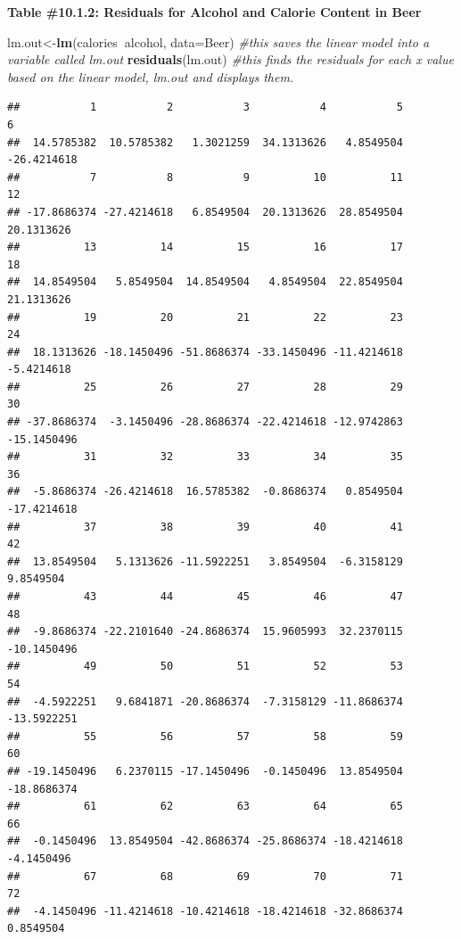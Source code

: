 \documentclass[
]{book}
\newenvironment{Shaded}{\begin{snugshade}}{\end{snugshade}}
\newcommand{\CommentTok}[1]{\textcolor[rgb]{0.56,0.35,0.01}{\textit{#1}}}
\newcommand{\DataTypeTok}[1]{\textcolor[rgb]{0.13,0.29,0.53}{#1}}
\newcommand{\KeywordTok}[1]{\textcolor[rgb]{0.13,0.29,0.53}{\textbf{#1}}}
\newcommand{\NormalTok}[1]{#1}
\newcommand{\OperatorTok}[1]{\textcolor[rgb]{0.81,0.36,0.00}{\textbf{#1}}}
\begin{document}
\textbf{Table \#10.1.2: Residuals for Alcohol and Calorie Content in Beer}

\begin{Shaded}
\begin{Highlighting}[]
\NormalTok{lm.out<-}\KeywordTok{lm}\NormalTok{(calories}\OperatorTok{~}\NormalTok{alcohol, }\DataTypeTok{data=}\NormalTok{Beer) }\CommentTok{#this saves the linear model into a variable called lm.out}
\KeywordTok{residuals}\NormalTok{(lm.out) }\CommentTok{#this finds the residuals for each x value based on the linear model, lm.out and displays them.}
\end{Highlighting}
\end{Shaded}

\begin{verbatim}
##           1           2           3           4           5           6 
##  14.5785382  10.5785382   1.3021259  34.1313626   4.8549504 -26.4214618 
##           7           8           9          10          11          12 
## -17.8686374 -27.4214618   6.8549504  20.1313626  28.8549504  20.1313626 
##          13          14          15          16          17          18 
##  14.8549504   5.8549504  14.8549504   4.8549504  22.8549504  21.1313626 
##          19          20          21          22          23          24 
##  18.1313626 -18.1450496 -51.8686374 -33.1450496 -11.4214618  -5.4214618 
##          25          26          27          28          29          30 
## -37.8686374  -3.1450496 -28.8686374 -22.4214618 -12.9742863 -15.1450496 
##          31          32          33          34          35          36 
##  -5.8686374 -26.4214618  16.5785382  -0.8686374   0.8549504 -17.4214618 
##          37          38          39          40          41          42 
##  13.8549504   5.1313626 -11.5922251   3.8549504  -6.3158129   9.8549504 
##          43          44          45          46          47          48 
##  -9.8686374 -22.2101640 -24.8686374  15.9605993  32.2370115 -10.1450496 
##          49          50          51          52          53          54 
##  -4.5922251   9.6841871 -20.8686374  -7.3158129 -11.8686374 -13.5922251 
##          55          56          57          58          59          60 
## -19.1450496   6.2370115 -17.1450496  -0.1450496  13.8549504 -18.8686374 
##          61          62          63          64          65          66 
##  -0.1450496  13.8549504 -42.8686374 -25.8686374 -18.4214618  -4.1450496 
##          67          68          69          70          71          72 
##  -4.1450496 -11.4214618 -10.4214618 -18.4214618 -32.8686374   0.8549504 

\end{verbatim}
\end{document}
